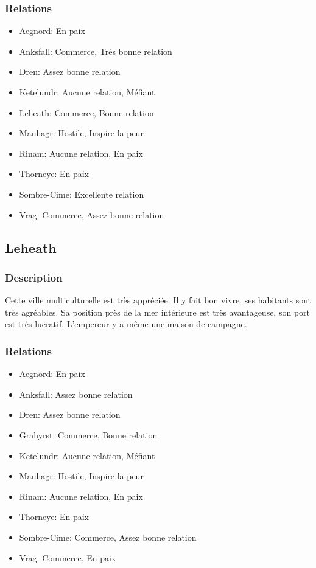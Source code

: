 \subsubsection{Relations} 
\begin{itemize}
\item Aegnord: En paix  
\item Anksfall: Commerce, Très bonne relation 
\item Dren: Assez bonne relation    
\item Ketelundr: Aucune relation, Méfiant 
\item Leheath: Commerce, Bonne relation 
\item Mauhagr: Hostile, Inspire la peur  
\item Rinam: Aucune relation, En paix 
\item Thorneye: En paix 
\item Sombre-Cime: Excellente relation 
\item Vrag: Commerce, Assez bonne relation 
\end{itemize}
\subsection{Leheath}
\subsubsection{Description}
\hypertarget {leheath}{}Cette ville multiculturelle est très appréciée.
Il y fait bon vivre, ses habitants sont très agréables.
Sa position près de la mer intérieure est très avantageuse, son port est très lucratif.
L'empereur y a même une maison de campagne.
\subsubsection{Relations}
\begin{itemize}
\item Aegnord: En paix 
\item Anksfall: Assez bonne relation 
\item Dren: Assez bonne relation    
\item Grahyrst: Commerce, Bonne relation 
\item Ketelundr: Aucune relation, Méfiant 
\item Mauhagr: Hostile, Inspire la peur  
\item Rinam: Aucune relation, En paix 
\item Thorneye: En paix 
\item Sombre-Cime: Commerce, Assez bonne relation  
\item Vrag: Commerce, En paix 
\end{itemize}
